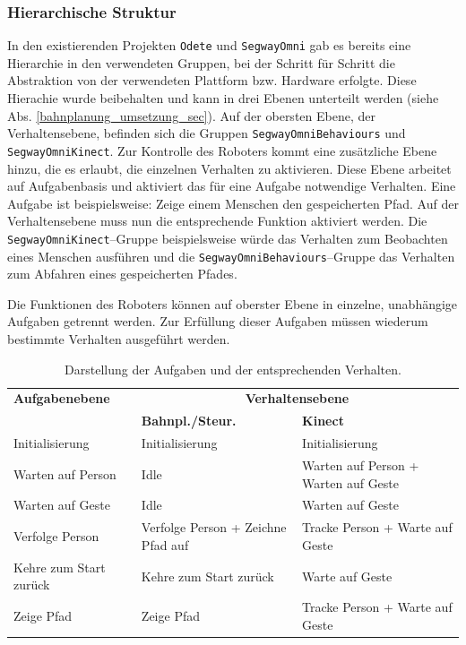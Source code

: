 \subsubsection{Hierarchische Struktur}
\label{integration_umsetzung_hierarchie_sec}

In den existierenden Projekten \lstinline{Odete} und \lstinline{SegwayOmni} gab es bereits eine Hierarchie 
in den verwendeten Gruppen, bei der Schritt für Schritt die Abstraktion von der verwendeten 
Plattform bzw. Hardware erfolgte. Diese Hierachie wurde beibehalten und kann in drei Ebenen unterteilt 
werden (siehe Abs. \ref{bahnplanung_umsetzung_sec}). Auf der obersten Ebene, der Verhaltensebene, befinden sich die 
Gruppen \lstinline{SegwayOmniBehaviours} und \lstinline{SegwayOmniKinect}. Zur Kontrolle des Roboters kommt 
eine zusätzliche Ebene hinzu, die es erlaubt, die einzelnen Verhalten zu aktivieren. Diese Ebene arbeitet auf 
Aufgabenbasis und aktiviert das für eine Aufgabe notwendige Verhalten.
Eine Aufgabe ist beispielsweise: Zeige einem Menschen den gespeicherten Pfad. Auf der Verhaltensebene muss nun die entsprechende 
Funktion aktiviert werden. Die
\lstinline{SegwayOmniKinect}--Gruppe beispielsweise würde das Verhalten zum Beobachten
eines Menschen ausführen und die \lstinline{SegwayOmniBehaviours}--Gruppe das
Verhalten zum Abfahren eines gespeicherten Pfades.

Die Funktionen des Roboters können auf oberster Ebene in einzelne, unabhängige Aufgaben getrennt werden. Zur Erfüllung dieser Aufgaben müssen wiederum bestimmte Verhalten ausgeführt werden.
\begin{table}[h]
	\label{tab:integration_aufgaben}
	\centering
	\begin{tabular}{|p{3.7cm}|p{3cm}|p{3.2cm}|}
	\hline
	\textbf{Aufgabenebene}	&	\multicolumn{2}{c|}{\textbf{Verhaltensebene}}\\
		&	\textbf{Bahnpl./Steur.}	&	\textbf{Kinect}	\\
	\hline
	Initialisierung	&	Initialisierung	&	Initialisierung \\
	\hline
	Warten auf Person	&	Idle	&	Warten auf Person + Warten auf Geste \\
	\hline
	Warten auf Geste	&	Idle	&	Warten auf Geste \\
	\hline
	Verfolge Person	&	Verfolge Person + Zeichne Pfad auf	&	Tracke Person + Warte auf Geste \\
	\hline
	Kehre zum Start zurück	&	Kehre zum Start zurück	&	Warte auf Geste \\
	\hline
	Zeige Pfad	& Zeige Pfad	&	Tracke Person + Warte auf Geste \\
	\hline
	\end{tabular}
	\caption{Darstellung der Aufgaben und der entsprechenden Verhalten.}
\end{table}

